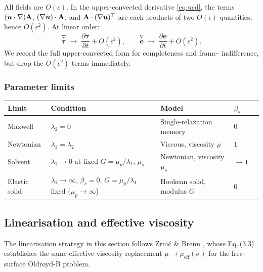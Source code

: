 \begin{notebox}
All fields are $O(\epsilon)$. In the upper-convected derivative
\eqref{eq:ucd}, the terms $(\bm{u}\cdot\nabla)\mathbf{A}$,
$(\nabla\bm{u})\cdot\mathbf{A}$, and $\mathbf{A}\cdot(\nabla\bm{u})^\top$ are
each products of two $O(\epsilon)$ quantities, hence $O(\epsilon^2)$.
At linear order:
\[
  \overset{\nabla}{\boldsymbol{\tau}} \;\longrightarrow\;
  \frac{\partial\boldsymbol{\tau}}{\partial t} + O(\epsilon^2), \qquad
  \overset{\nabla}{\mathbf{e}} \;\longrightarrow\;
  \frac{\partial\mathbf{e}}{\partial t} + O(\epsilon^2).
\]
We record the full upper-convected form for completeness and frame-
indifference, but drop the $O(\epsilon^2)$ terms immediately.
\end{notebox}

\subsubsection{Parameter limits}

\begin{center}
\begin{tabular}{lllll}
  \toprule
  Limit & Condition & Model & $\beta_s$ & \\
  \midrule
  Maxwell    & $\lambda_2 = 0$        & Single-relaxation memory & $0$     & \\
  Newtonian  & $\lambda_1 = \lambda_2$& Viscous, viscosity $\mu$ & $1$     & \\
  Solvent    & $\lambda_1\to 0$ at fixed $G=\mu_p/\lambda_1$, $\mu_s$
                                      & Newtonian, viscosity $\mu_s$ & $\to 1$ & \\
  Elastic solid & $\lambda_1\to\infty$, $\beta_s=0$, $G=\mu_p/\lambda_1$ fixed ($\mu_p\to\infty$)
                                      & Hookean solid, modulus $G$ & $0$ & \\
  \bottomrule
\end{tabular}
\end{center}

\subsection{Linearisation and effective viscosity}

The linearisation strategy in this section follows Zrni\'{c} \& Brenn
\cite{zirnic2024}, whose Eq.\,(3.3) establishes the same effective-viscosity
replacement $\mu \to \mu_{\mathrm{eff}}(\sigma)$ for the free-surface Oldroyd-B
problem.

